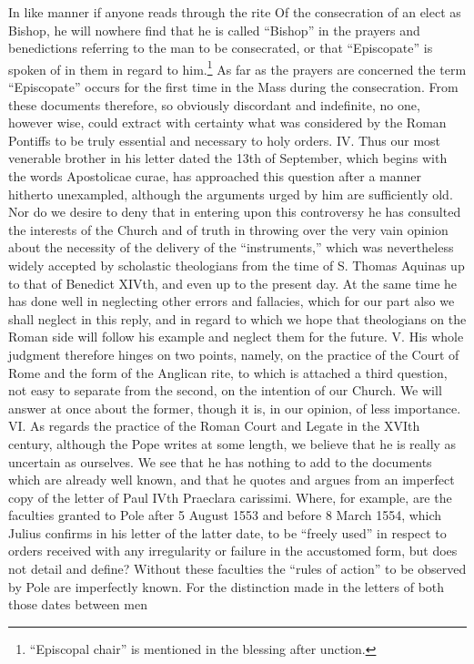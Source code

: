 In like manner if anyone reads through the rite Of the consecration of an elect as Bishop, he will nowhere find that he is called “Bishop” in the prayers and benedictions referring to the man to be consecrated, or that “Episcopate” is spoken of in them in regard to him.\footnote{“Episcopal chair” is mentioned in the blessing after unction.} As far as the prayers are concerned the term “Episcopate” occurs for the first time in the Mass during the consecration. From these documents therefore, so obviously discordant and indefinite, no one, however wise, could extract with certainty what was considered by the Roman Pontiffs to be truly essential and necessary to holy orders. IV. Thus our most venerable brother in his letter dated the 13th of September, which begins with the words Apostolicae curae, has approached this question after a manner hitherto unexampled, although the arguments urged by him are sufficiently old. Nor do we desire to deny that in entering upon this controversy he has consulted the interests of the Church and of truth in throwing over the very vain opinion about the necessity of the delivery of the “instruments,” which was nevertheless widely accepted by scholastic theologians from the time of S. Thomas Aquinas up to that of Benedict XIVth, and even up to the present day. At the same time he has done well in neglecting other errors and fallacies, which for our part also we shall neglect in this reply, and in regard to which we hope that theologians on the Roman side will follow his example and neglect them for the future. V. His whole judgment therefore hinges on two points, namely, on the practice of the Court of Rome and the form of the Anglican rite, to which is attached a third question, not easy to separate from the second, on the intention of our Church. We will answer at once about the former, though it is, in our opinion, of less importance. VI. As regards the practice of the Roman Court and Legate in the XVIth century, although the Pope writes at some length, we believe that he is really as uncertain as ourselves. We see that he has nothing to add to the documents which are already well known, and that he quotes and argues from an imperfect copy of the letter of Paul IVth Praeclara carissimi. Where, for example, are the faculties granted to Pole after 5 August 1553 and before 8 March 1554, which Julius confirms in his letter of the latter date, to be “freely used” in respect to orders received with any irregularity or failure in the accustomed form, but does not detail and define? Without these faculties the “rules of action” to be observed by Pole are imperfectly known. For the distinction made in the letters of both those dates between men


